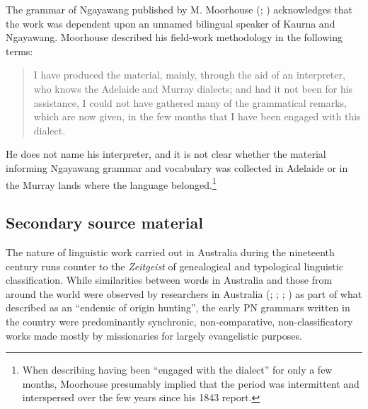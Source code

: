 The grammar of Ngayawang published by M. Moorhouse (\citeyear[v]{moorhouse_vocabulary_1846}; ) acknowledges that the work was dependent upon an unnamed bilingual speaker of Kaurna and Ngayawang. Moorhouse described his field-work methodology in the following terms: 

\begin{quote}
    I have produced the material, mainly, through the aid of an interpreter, who knows the Adelaide and Murray dialects; and had it not been for his assistance, I could not have gathered many of the grammatical remarks, which are now given, in the few months that I have been engaged with this dialect. \citep[v]{moorhouse_vocabulary_1846}
\end{quote}

He does not name his interpreter, and it is not clear whether the material informing  Ngayawang grammar and vocabulary was collected in Adelaide or in the Murray lands where the language belonged.\footnote{When describing having been “engaged with the dialect” for only a few months, Moorhouse presumably implied that the period was intermittent and interspersed over the few years since his 1843 report.}  

\subsection{Secondary source material}
\label{sec:key:1.1.4}
\largerpage
The nature of linguistic work carried out in Australia during the nineteenth century runs counter to the \textit{Zeitgeist} of genealogical and typological linguistic classification. While similarities between words in Australia and those from around the world were observed by researchers in Australia (\citealt{grey_languages_1845}; \citealt{taplin_narrinyeri_1879}; \citealt{curr_australian_1886}; \citealt{fraser_australian_1892}) as part of what \citet[667]{capell_history_1970} described as an “endemic of origin hunting”, the early PN grammars written in the country were predominantly synchronic, non-comparative, non-classificatory works made mostly by missionaries for largely evangelistic purposes. 

